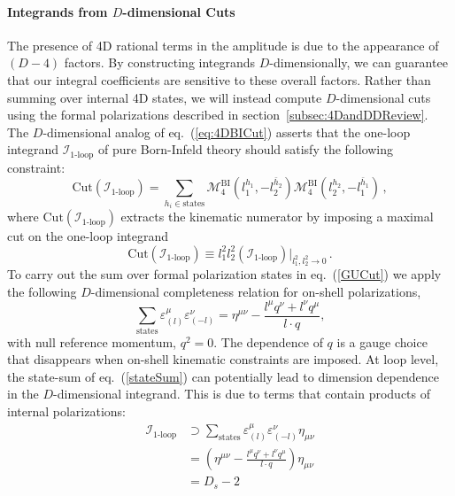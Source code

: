 \documentclass[11pt,letter]{article}
\def\sect#1{section~\ref{#1}}
\def\eqn#1{eq.~(\ref{#1})}
\begin{document}
\paragraph{Integrands from $D$-dimensional Cuts}
The presence of 4D rational terms in the amplitude is due to the appearance of $(D-4)$ factors. By constructing integrands $D$-dimensionally, we can guarantee that our integral coefficients are sensitive to these overall factors. Rather than summing over internal 4D states, we will instead compute $D$-dimensional cuts using the formal polarizations described in \sect{subsec:4DandDDReview}. The $D$-dimensional analog of \eqn{eq:4DBICut} asserts that the one-loop integrand $\mathcal{I}_{\text{1-loop}}$ of pure Born-Infeld theory should satisfy the following constraint:
\begin{equation}
\label{GUCut}
\text{Cut}( \mathcal{I}_{\text{1-loop}}) = \sum_{h_i\in \text{states}} \mathcal{M}^{\text{BI}}_4(l_1^{h_1},-l_2^{\bar{h}_2})\mathcal{M}^{\text{BI}}_4(l_2^{h_2},-l_1^{\bar{h}_1})\,,
\end{equation}  
where $\text{Cut}( \mathcal{I}_{\text{1-loop}}) $ extracts the kinematic numerator by imposing a maximal cut on the one-loop integrand 
\begin{equation}
\text{Cut}( \mathcal{I}_{\text{1-loop}})  \equiv l_1^2l_2^2(\mathcal{I}_{\text{1-loop}})\Big|_{l_1^2,l_2^2\rightarrow 0}\,.
\end{equation}
To carry out the sum over formal polarization states in \eqn{GUCut} we apply the following $D$-dimensional completeness relation for on-shell polarizations,
\begin{equation}\label{stateSum}
\sum_{\text{states}}\varepsilon^\mu_{(l)}\varepsilon^\nu_{(-l)} = \eta^{\mu\nu} - \frac{l^\mu q^\nu+l^\nu q^\mu}{l\cdot q},
\end{equation}
with null reference momentum, $q^2=0$. The dependence of $q$ is a gauge choice that disappears when on-shell kinematic constraints are imposed. At loop level, the state-sum of \eqn{stateSum} can potentially lead to dimension dependence in the $D$-dimensional integrand. This is due to terms that contain products of internal polarizations:
\begin{equation}
\begin{aligned}
 \mathcal{I}_{\text{1-loop}} &\supset \sum_{ \text{states}} \varepsilon^\mu_{(l)}\varepsilon^\nu_{(-l)} \eta_{\mu\nu}
 \\
 &=\left(\eta^{\mu\nu} - \frac{l^\mu q^\nu+l^\nu q^\mu}{l\cdot q}\right) \eta_{\mu\nu}
 \\
 &=D_s-2
 \end{aligned}
\end{equation}
\end{document}
